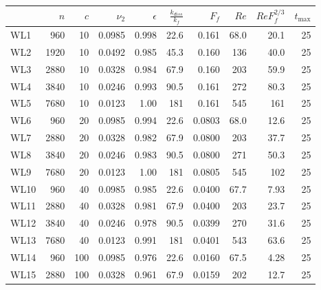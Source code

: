 \begin{tabular}{lrrrrrrrrr}
\toprule
{} &   $n$ &  $c$ &  $\nu_2$ &  $\epsilon$ &  $\frac{k_{diss}}{k_f}$ &   $F_f$ &  $Re$ &  $ReF_f^{2/3}$ &  $t_{\max}$ \\
\midrule
WL1  &   960 &   10 &   0.0985 &       0.998 &                    22.6 &   0.161 &  68.0 &           20.1 &          25 \\
WL2  &  1920 &   10 &   0.0492 &       0.985 &                    45.3 &   0.160 &   136 &           40.0 &          25 \\
WL3  &  2880 &   10 &   0.0328 &       0.984 &                    67.9 &   0.160 &   203 &           59.9 &          25 \\
WL4  &  3840 &   10 &   0.0246 &       0.993 &                    90.5 &   0.161 &   272 &           80.3 &          25 \\
WL5  &  7680 &   10 &   0.0123 &        1.00 &                     181 &   0.161 &   545 &            161 &          25 \\
WL6  &   960 &   20 &   0.0985 &       0.994 &                    22.6 &  0.0803 &  68.0 &           12.6 &          25 \\
WL7  &  2880 &   20 &   0.0328 &       0.982 &                    67.9 &  0.0800 &   203 &           37.7 &          25 \\
WL8  &  3840 &   20 &   0.0246 &       0.983 &                    90.5 &  0.0800 &   271 &           50.3 &          25 \\
WL9  &  7680 &   20 &   0.0123 &        1.00 &                     181 &  0.0805 &   545 &            102 &          25 \\
WL10 &   960 &   40 &   0.0985 &       0.985 &                    22.6 &  0.0400 &  67.7 &           7.93 &          25 \\
WL11 &  2880 &   40 &   0.0328 &       0.981 &                    67.9 &  0.0400 &   203 &           23.7 &          25 \\
WL12 &  3840 &   40 &   0.0246 &       0.978 &                    90.5 &  0.0399 &   270 &           31.6 &          25 \\
WL13 &  7680 &   40 &   0.0123 &       0.991 &                     181 &  0.0401 &   543 &           63.6 &          25 \\
WL14 &   960 &  100 &   0.0985 &       0.976 &                    22.6 &  0.0160 &  67.5 &           4.28 &          25 \\
WL15 &  2880 &  100 &   0.0328 &       0.961 &                    67.9 &  0.0159 &   202 &           12.7 &          25 \\

\end{tabular}
